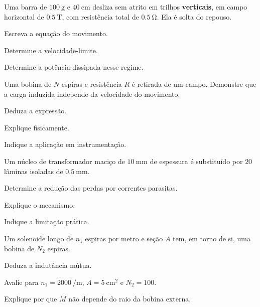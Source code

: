 \blocoaprofundamento
\begin{questao}[3]{}

Uma barra de $\SI{100}{\gram}$ e $\SI{40}{\centi\meter}$ desliza sem atrito em
trilhos \textbf{verticais}, em campo horizontal de $\SI{0.5}{\tesla}$, com
resistência total de $\SI{0.5}{\ohm}$. Ela é solta do repouso.
\begin{itensq}
\item Escreva a equação do movimento.
\item Determine a velocidade-limite.
\item Determine a potência dissipada nesse regime.
\end{itensq}


\end{questao}
\begin{questao}[3]{}

Uma bobina de $N$ espiras e resistência $R$ é retirada de um campo. Demonstre
que a carga induzida independe da velocidade do movimento.
\begin{itensq}
\item Deduza a expressão.
\item Explique fisicamente.
\item Indique a aplicação em instrumentação.
\end{itensq}


\end{questao}
\begin{questao}[3]{}

Um núcleo de transformador maciço de $\SI{10}{\milli\meter}$ de espessura é
substituído por $20$ lâminas isoladas de $\SI{0.5}{\milli\meter}$.
\begin{itensq}
\item Determine a redução das perdas por correntes parasitas.
\item Explique o mecanismo.
\item Indique a limitação prática.
\end{itensq}


\end{questao}
\begin{questao}[3]{}

Um solenoide longo de $n_1$ espiras por metro e seção $A$ tem, em torno de si,
uma bobina de $N_2$ espiras.
\begin{itensq}
\item Deduza a indutância mútua.
\item Avalie para $n_1=\SI{2000}{\per\meter}$, $A=\SI{5}{\centi\meter\squared}$
      e $N_2=100$.
\item Explique por que $M$ não depende do raio da bobina externa.
\end{itensq}


\end{questao}
